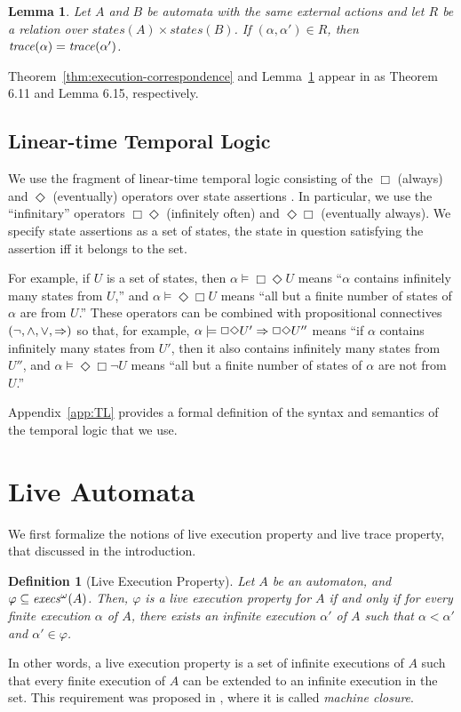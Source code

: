 \documentclass[11pt]{article}
\newcommand{\bl}{\begin{lemma}}
\newcommand{\el}{\end{lemma}}
\newcommand{\bd}{\begin{definition}}
\newcommand{\ed}{\end{definition}}
\newcommand{\sat}{\models}
\newcommand{\al}{\alpha}
\newcommand{\iexecs}{\mathit{execs}^\omega}
\newcommand{\states}{\mathit{states}}
\newcommand{\ea}{\Diamond \Box}
\newcommand{\iof}{\Box \Diamond}
\newcommand{\always}{\Box}
\newcommand{\eventually}{\Diamond}
\newtheorem{lemma}[theorem]{Lemma}
\newtheorem{definition}{Definition}
\begin{document}
\bl  
Let $A$ and $B$ be automata with the same external actions and let $R$
be a relation over $\states(A) \times \states(B)$. If $(\alpha,
\alpha') \in R$, then $\mathit{trace}(\alpha) = \mathit{trace}(\alpha')$.
\label{lem:traces}
\el


Theorem~\ref{thm:execution-correspondence} and Lemma~\ref{lem:traces} appear
in \cite{GSSL93} as Theorem 6.11 and Lemma 6.15, respectively.




\subsection{Linear-time Temporal Logic}

We use the fragment of linear-time temporal
logic consisting of the $\always$ (always) and
$\eventually$ (eventually) operators over state assertions \cite{Pn77,MP92}.
In particular, we use the ``infinitary'' operators $\iof$ (infinitely often)
and $\ea$ (eventually always).
We specify state assertions as a set of states, the state in question
satisfying the assertion iff it belongs to the set.

For example, if $U$ is a set of states, then
$\alpha \sat \iof U$ means ``$\alpha$ contains infinitely many states from $U$,''
and
$\alpha \sat \ea U$ means ``all but a finite number of states of
                          $\alpha$ are from $U$.'' 
These operators can be combined with propositional connectives
$(\neg, \land, \lor, \Rightarrow)$ so that, for example,
$\alpha \sat \iof U' \imp \iof U''$ means ``if $\alpha$ contains
infinitely many states from $U'$, then it also contains 
infinitely many states from $U''$,
and
$\alpha \sat \ea \neg U$ means ``all but a finite number of states of
                               $\alpha$ are not from $U$.'' 

Appendix~\ref{app:TL} provides a formal definition of the syntax and
semantics of the temporal logic that we use.


\section{Live Automata}
\label{sec:live-automata}

We first formalize the notions of live execution property and live
trace property, that discussed in the introduction.


\bd[Live Execution Property]
\label{def:liveness-property}
Let $A$ be an automaton, and $\varphi \sub \iexecs(A)$. Then,
$\varphi$ is a \emph{live execution property} for $A$ if and only if
for every finite execution $\al$ of $A$, there exists an infinite
execution $\al'$ of $A$ such that
$\al < \al'$ and $\al' \in \varphi$.
\ed
In other words, a live execution property is a set of infinite
executions of $A$ such that every finite execution of $A$ can be
extended to an infinite execution in the set.
This requirement was proposed in \cite{AL91}, where it is called
\emph{machine closure}.
\end{document}
